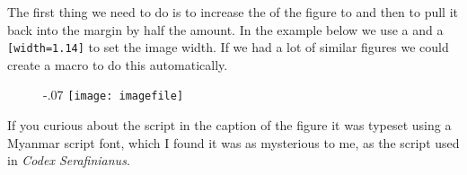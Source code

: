 The first thing we need to do is to increase the \cmd{\textwidth} of the figure to and then to pull it back into
the margin by half the amount. In the example below we use a  and a \texttt{[width=1.14\string\textwidth]} to set the image width. If we had a lot of similar figures we could create a macro to do this automatically.

\begin{teX}
\begin{figure}[htbp]
\leftskip-.07%
   \textwidth\texttt{[image: imagefile]}\par
\end{figure}
\end{teX}

If you curious about the script in the caption of the figure it was typeset using a Myanmar script font, which I found it was as mysterious to me, as the script used in \textit{Codex Serafinianus}. 


\long{}






